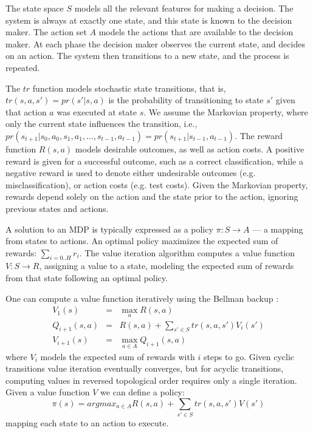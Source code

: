 \documentclass[letterpaper]{article}
\theoremstyle{definition}
\begin{document}
The state space $S$ models all the relevant features for making a decision. The system is always at exactly one state, and this state is known to the decision maker. The action set $A$ models the actions that are available to the decision maker. At each phase the decision maker observes the current state, and decides on an action. The system then transitions to a new state, and the process is repeated.

The $tr$ function models stochastic state transitions, that is, $tr(s,a,s')=pr(s'|s,a)$ is the probability of transitioning to state $s'$ given that action $a$ was executed at state $s$. We assume the Markovian property, where only the current state influences the transition, i.e., $pr(s_{t+1}|s_0,a_0,s_1,a_1,...,s_{t-1},a_{t-1})=pr(s_{t+1}|s_{t-1},a_{t-1})$.
The reward function $R(s,a)$ models desirable outcomes, as well as action costs.
A positive reward is given for a successful outcome, such as a correct classification, while a negative reward is used to denote either undesirable outcomes (e.g. misclassification), or action costs (e.g. test costs). Given the Markovian property, rewards depend solely on the action and the state prior to the action, ignoring previous states and actions.


A solution to an MDP is typically expressed as a policy $\pi:S\rightarrow A$ --- a mapping from states to actions. An optimal policy maximizes the expected sum of rewards: $\sum_{i=0..H} r_i$. The value iteration algorithm computes a value function $V:S \rightarrow R$, assigning a value to a state, modeling the expected sum of rewards from that state following an optimal policy.

One can compute a value function iteratively using the Bellman backup \cite{Bellman}:
{\footnotesize
\begin{eqnarray}
V_1(s)&=&\max_a R(s,a)\\
Q_{i+1}(s,a)&=&R(s,a) + \sum_{s' \in S}tr(s,a,s') V_i(s')\\
V_{i+1}(s)&=& \max_{a \in A}  Q_{i+1}(s,a)
\end{eqnarray}
}
where $V_i$ models the expected sum of rewards with $i$ steps to go. Given cyclic transitions value iteration eventually converges, 
but for acyclic transitions, computing values in reversed topological order requires only a single iteration.
Given a value function $V$ we can define a policy:
{\footnotesize
\begin{equation}
\pi(s)=argmax_{a \in A} R(s,a) + \sum_{s' \in S} tr(s,a,s') V(s')
\end{equation}
}
mapping each state to an action to execute.
\end{document}
